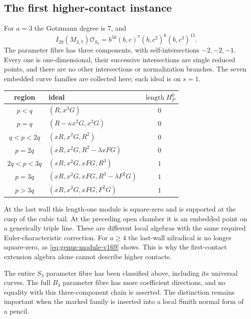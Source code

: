 \documentclass[11pt,reqno]{amsart}
\numberwithin{equation}{section}
\theoremstyle{definition}\newtheorem{definition}[theorem]{Definition}
\theoremstyle{remark}\newtheorem{remark}[theorem]{Remark}
\newcommand{\OO}{\mathcal O}\newcommand{\II}{\mathcal I}
\DeclareMathOperator{\length}{length}
\begin{document}
\subsection{The first higher-contact instance}
For $a=3$ the Gotzmann degree is $7$, and
\begin{equation}\label{eq:cubic-factor-v169}
 I_{29}(M_{3,7})\OO_{S_3}
       =b^{56}(b,c)^7(b,c^2)^6(b,c^3)^{15}.
\end{equation}
The parameter fibre has three components, with self-intersections
$-2,-2,-1$. Every one is one-dimensional, their successive
intersections are single reduced points, and there are no other
intersections or normalization branches. The seven embedded curve
families are collected here; each ideal is on $s=1$.
\begin{center}
\small
\begin{tabular}{c|l|c}
region & ideal & $\length H^0_P$\\ \hline
$p<q$ & $(R,x^3G)$ & $0$\\
$p=q$ & $(R-\kappa x^2G,x^3G)$ & $0$\\
$q<p<2q$ & $(xR,x^2G,R^2)$ & $0$\\
$p=2q$ & $(xR,x^2G,R^2-\lambda xFG)$ & $0$\\
$2q<p<3q$ & $(xR,x^2G,xFG,R^3)$ & $1$\\
$p=3q$ & $(xR,x^2G,xFG,R^3-\lambda F^2G)$ & $1$\\
$p>3q$ & $(xR,x^2G,xFG,F^2G)$ & $1$
\end{tabular}
\end{center}
At the last wall this length-one module is square-zero and is supported
at the cusp of the cubic tail. At the preceding open chamber it is
an embedded point on a generically triple line. These are different
local algebras with the same required Euler-characteristic correction.
For $a\geq4$ the last-wall nilradical is no longer square-zero, as
\eqref{eq:genus-module-v169} shows. This is why the first-contact
extension algebra alone cannot describe higher contacts.

The entire $S_3$ parameter fibre has been classified above, including
its universal curves. The full $B_3$ parameter fibre has more
coefficient directions, and no equality with this three-component
chain is asserted. The distinction remains important when the
marked family is inserted into a local Smith normal form of a pencil.
\end{document}
